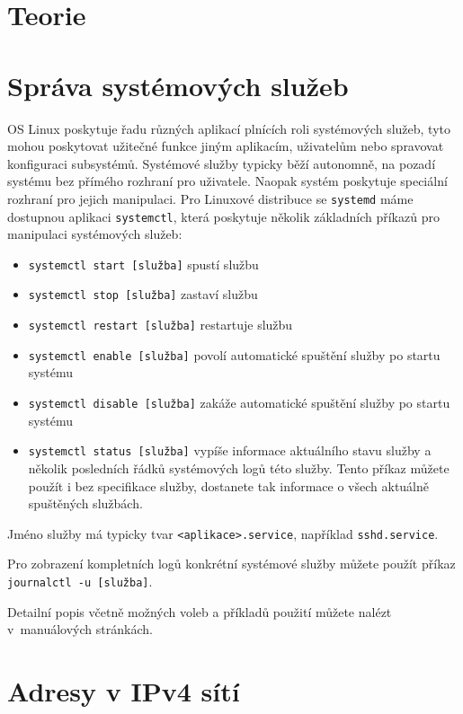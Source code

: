 \setcounter{section}{0}
\section*{Teorie}
\section{Správa systémových služeb}\label{sluzby-teorie}
OS Linux poskytuje řadu různých aplikací plnících roli systémových služeb, tyto
mohou poskytovat užitečné funkce jiným aplikacím, uživatelům nebo spravovat
konfiguraci subsystémů. Systémové služby typicky běží autonomně, na pozadí
systému bez přímého rozhraní pro uživatele. Naopak systém poskytuje speciální
rozhraní pro jejich manipulaci. Pro Linuxové distribuce se \texttt{systemd} máme
dostupnou aplikaci \texttt{systemctl}, která poskytuje několik základních
příkazů pro manipulaci systémových služeb:
\begin{itemize}
    \item \texttt{systemctl start [služba]} spustí službu
    \item \texttt{systemctl stop [služba]} zastaví službu
    \item \texttt{systemctl restart [služba]} restartuje službu
    \item \texttt{systemctl enable [služba]} povolí automatické spuštění služby
        po startu systému
    \item \texttt{systemctl disable [služba]} zakáže automatické spuštění
        služby po startu systému
    \item \texttt{systemctl status [služba]} vypíše informace aktuálního stavu
        služby a několik posledních řádků systémových logů této služby. Tento
        příkaz můžete použít i bez specifikace služby, dostanete tak informace
        o všech aktuálně spuštěných službách.
\end{itemize}

Jméno služby má typicky tvar \texttt{<aplikace>.service}, například
\texttt{sshd.service}.

Pro zobrazení kompletních logů konkrétní systémové služby můžete použít příkaz
\texttt{journalctl -u [služba]}.

Detailní popis včetně možných voleb a příkladů použití můžete nalézt
v~manuálových stránkách.

\section{Adresy v IPv4 sítí}\label{ipv4-teorie}

